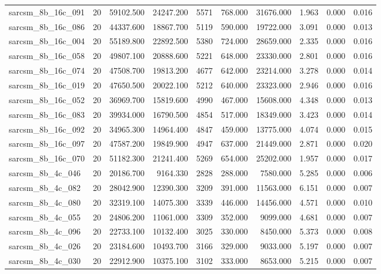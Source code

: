 \begin{tabular}{lrrrrrrrrr}
sarcsm\_8b\_16c\_091 & 20 & 59102.500 & 24247.200 & 5571 & 768.000 & 31676.000 & 1.963 & 0.000 & 0.016 \\
sarcsm\_8b\_16c\_086 & 20 & 44337.600 & 18867.700 & 5119 & 590.000 & 19722.000 & 3.091 & 0.000 & 0.013 \\
sarcsm\_8b\_16c\_004 & 20 & 55189.800 & 22892.500 & 5380 & 724.000 & 28659.000 & 2.335 & 0.000 & 0.016 \\
sarcsm\_8b\_16c\_058 & 20 & 49807.100 & 20888.600 & 5221 & 648.000 & 23330.000 & 2.801 & 0.000 & 0.016 \\
sarcsm\_8b\_16c\_074 & 20 & 47508.700 & 19813.200 & 4677 & 642.000 & 23214.000 & 3.278 & 0.000 & 0.014 \\
sarcsm\_8b\_16c\_019 & 20 & 47650.500 & 20022.100 & 5212 & 640.000 & 23323.000 & 2.946 & 0.000 & 0.016 \\
sarcsm\_8b\_16c\_052 & 20 & 36969.700 & 15819.600 & 4990 & 467.000 & 15608.000 & 4.348 & 0.000 & 0.013 \\
sarcsm\_8b\_16c\_083 & 20 & 39934.000 & 16790.500 & 4854 & 517.000 & 18349.000 & 3.423 & 0.000 & 0.014 \\
sarcsm\_8b\_16c\_092 & 20 & 34965.300 & 14964.400 & 4847 & 459.000 & 13775.000 & 4.074 & 0.000 & 0.015 \\
sarcsm\_8b\_16c\_097 & 20 & 47587.200 & 19849.900 & 4947 & 637.000 & 21449.000 & 2.871 & 0.000 & 0.020 \\
sarcsm\_8b\_16c\_070 & 20 & 51182.300 & 21241.400 & 5269 & 654.000 & 25202.000 & 1.957 & 0.000 & 0.017 \\
sarcsm\_8b\_4c\_046 & 20 & 20186.700 & 9164.330 & 2828 & 288.000 & 7580.000 & 5.285 & 0.000 & 0.006 \\
sarcsm\_8b\_4c\_082 & 20 & 28042.900 & 12390.300 & 3209 & 391.000 & 11563.000 & 6.151 & 0.000 & 0.007 \\
sarcsm\_8b\_4c\_080 & 20 & 32319.100 & 14075.300 & 3339 & 446.000 & 14456.000 & 4.571 & 0.000 & 0.010 \\
sarcsm\_8b\_4c\_055 & 20 & 24806.200 & 11061.000 & 3309 & 352.000 & 9099.000 & 4.681 & 0.000 & 0.007 \\
sarcsm\_8b\_4c\_096 & 20 & 22733.100 & 10132.400 & 3025 & 330.000 & 8450.000 & 5.373 & 0.000 & 0.008 \\
sarcsm\_8b\_4c\_026 & 20 & 23184.600 & 10493.700 & 3166 & 329.000 & 9033.000 & 5.197 & 0.000 & 0.007 \\
sarcsm\_8b\_4c\_030 & 20 & 22912.900 & 10375.100 & 3102 & 333.000 & 8653.000 & 5.215 & 0.000 & 0.007 \\

\end{tabular}

